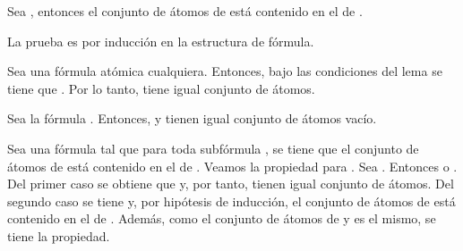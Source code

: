 \begin{isabellebody}
\begin{isamarkuptext}
  \begin{lema}
    Sea , entonces el conjunto de átomos de  está 
  contenido en el de .
  \end{lema} 

  \begin{demostracion}
  La prueba es por inducción en la estructura de fórmula.
  
  Sea  una fórmula atómica cualquiera. Entonces, bajo las
  condiciones del lema se tiene que . Por lo tanto, tiene igual
  conjunto de átomos.

  Sea la fórmula \isa{{\isasymbottom}}. Entonces,  y tienen igual conjunto de
  átomos vacío.

  Sea una fórmula  tal que para toda subfórmula , se tiene que el
  conjunto de átomos de  está contenido en el de . Veamos la
  propiedad para . Sea . 
  Entonces  o . 
  Del primer caso se obtiene que  y, por tanto, tienen igual 
  conjunto de átomos. Del segundo caso se tiene  y, por 
  hipótesis de inducción, el conjunto de átomos de  está contenido 
  en el de . Además, como el conjunto de átomos de  y  es el 
  mismo, se tiene la propiedad.


\end{demostracion}
\end{isamarkuptext}
\end{isabellebody}
